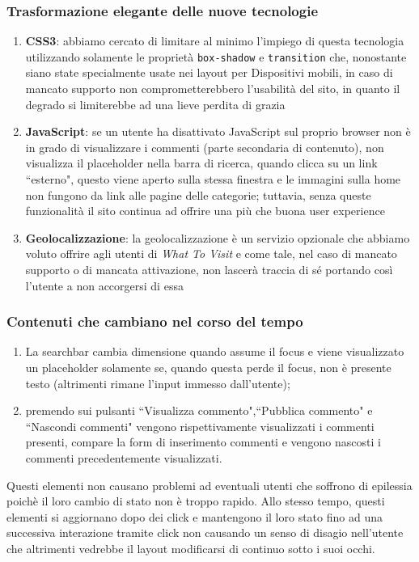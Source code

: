 \subsubsection{Trasformazione elegante delle nuove tecnologie}
\begin{enumerate}
\item \textbf{CSS3}: abbiamo cercato di limitare al minimo l'impiego di questa tecnologia utilizzando solamente le proprietà \texttt{box-shadow} e \texttt{transition} che, nonostante siano state specialmente usate nei layout per Dispositivi mobili, in caso di mancato supporto non comprometterebbero l'usabilità del sito, in quanto il degrado si limiterebbe ad una lieve perdita di grazia
\item \textbf{JavaScript}: se un utente ha disattivato JavaScript sul proprio
browser non è in grado di visualizzare i commenti (parte secondaria di contenuto), non visualizza il placeholder nella barra di ricerca, quando clicca su un link ``esterno", questo viene aperto sulla stessa finestra e le immagini sulla home non fungono da link alle pagine delle categorie; tuttavia, senza queste funzionalità il sito continua ad offrire una più che buona user experience
\item \textbf{Geolocalizzazione}: la geolocalizzazione è un servizio opzionale che abbiamo voluto offrire agli utenti di \textit{What To Visit} e come tale, nel caso di mancato supporto o di mancata attivazione, non lascerà traccia di sé portando così l'utente a non accorgersi di essa
\end{enumerate}

\subsubsection{Contenuti che cambiano nel corso del tempo}
\begin{enumerate}
\item La searchbar cambia dimensione quando assume il focus e viene
visualizzato un placeholder solamente se, quando questa perde il focus, non è
presente testo (altrimenti rimane l'input immesso dall'utente);
\item premendo sui pulsanti ``Visualizza commento",``Pubblica commento" e
``Nascondi commenti" vengono rispettivamente visualizzati i commenti presenti,
compare la form di inserimento commenti e vengono nascosti i commenti
precedentemente visualizzati.
\end{enumerate}

Questi elementi non causano problemi ad eventuali utenti che soffrono di
epilessia poichè il loro cambio di stato non è troppo rapido. Allo stesso
tempo, questi elementi si aggiornano dopo dei click e mantengono il loro stato
fino ad una successiva interazione tramite click non causando un senso di
disagio nell'utente che altrimenti vedrebbe il layout modificarsi di continuo
sotto i suoi occhi.

